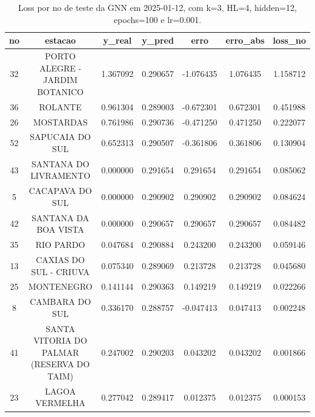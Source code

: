 \begin{table}[h]
\centering
\caption{Loss por no de teste da GNN em 2025-01-12, com k=3, HL=4, hidden=12, epochs=100 e lr=0.001.}
\label{tab:gnn_loss_k3_hl4_h12_e100_d20250112}
\begin{tabular}{ccccccc}
\toprule
no & estacao & y\_real & y\_pred & erro & erro\_abs & loss\_no \\
\midrule
32 & PORTO ALEGRE - JARDIM BOTANICO & 1.367092 & 0.290657 & -1.076435 & 1.076435 & 1.158712 \\
36 & ROLANTE & 0.961304 & 0.289003 & -0.672301 & 0.672301 & 0.451988 \\
26 & MOSTARDAS & 0.761986 & 0.290736 & -0.471250 & 0.471250 & 0.222077 \\
52 & SAPUCAIA DO SUL & 0.652313 & 0.290507 & -0.361806 & 0.361806 & 0.130904 \\
43 & SANTANA DO LIVRAMENTO & 0.000000 & 0.291654 & 0.291654 & 0.291654 & 0.085062 \\
5 & CACAPAVA DO SUL & 0.000000 & 0.290902 & 0.290902 & 0.290902 & 0.084624 \\
42 & SANTANA DA BOA VISTA & 0.000000 & 0.290657 & 0.290657 & 0.290657 & 0.084482 \\
35 & RIO PARDO & 0.047684 & 0.290884 & 0.243200 & 0.243200 & 0.059146 \\
13 & CAXIAS DO SUL - CRIUVA & 0.075340 & 0.289069 & 0.213728 & 0.213728 & 0.045680 \\
25 & MONTENEGRO & 0.141144 & 0.290363 & 0.149219 & 0.149219 & 0.022266 \\
8 & CAMBARA DO SUL & 0.336170 & 0.288757 & -0.047413 & 0.047413 & 0.002248 \\
41 & SANTA VITORIA DO PALMAR (RESERVA DO TAIM) & 0.247002 & 0.290203 & 0.043202 & 0.043202 & 0.001866 \\
23 & LAGOA VERMELHA & 0.277042 & 0.289417 & 0.012375 & 0.012375 & 0.000153 \\
\bottomrule
\end{tabular}
\end{table}
